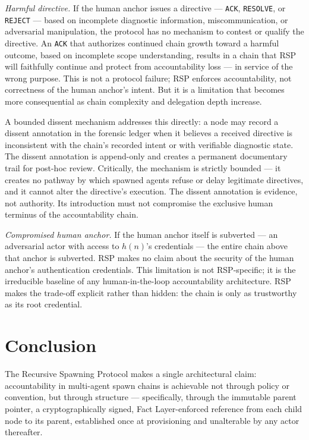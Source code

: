 \textit{Harmful directive.} If the human anchor issues a directive — \texttt{ACK}, \texttt{RESOLVE}, or \texttt{REJECT} — based on incomplete diagnostic information, miscommunication, or adversarial manipulation, the protocol has no mechanism to contest or qualify the directive. An \texttt{ACK} that authorizes continued chain growth toward a harmful outcome, based on incomplete scope understanding, results in a chain that RSP will faithfully continue and protect from accountability loss — in service of the wrong purpose. This is not a protocol failure; RSP enforces accountability, not correctness of the human anchor's intent. But it is a limitation that becomes more consequential as chain complexity and delegation depth increase.

A bounded dissent mechanism addresses this directly: a node may record a dissent annotation in the forensic ledger when it believes a received directive is inconsistent with the chain's recorded intent or with verifiable diagnostic state. The dissent annotation is append-only and creates a permanent documentary trail for post-hoc review. Critically, the mechanism is strictly bounded — it creates no pathway by which spawned agents refuse or delay legitimate directives, and it cannot alter the directive's execution. The dissent annotation is evidence, not authority. Its introduction must not compromise the exclusive human terminus of the accountability chain.

\textit{Compromised human anchor.} If the human anchor itself is subverted — an adversarial actor with access to $h(n)$'s credentials — the entire chain above that anchor is subverted. RSP makes no claim about the security of the human anchor's authentication credentials. This limitation is not RSP-specific; it is the irreducible baseline of any human-in-the-loop accountability architecture. RSP makes the trade-off explicit rather than hidden: the chain is only as trustworthy as its root credential.

\section{Conclusion}
\label{sec:rs-conclusion}

The Recursive Spawning Protocol makes a single architectural claim: accountability in multi-agent spawn chains is achievable not through policy or convention, but through structure — specifically, through the immutable parent pointer, a cryptographically signed, Fact Layer-enforced reference from each child node to its parent, established once at provisioning and unalterable by any actor thereafter.

